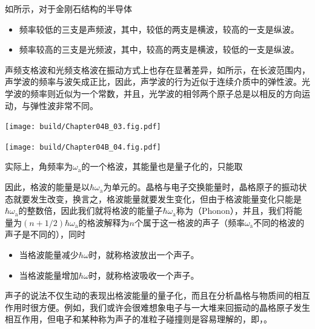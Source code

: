 如所示，对于金刚石结构的半导体
\begin{itemize}
    \item 频率较低的三支是声频波，其中，较低的两支是横波，较高的一支是纵波。
    \item 频率较高的三支是光频波，其中，较高的两支是横波，较低的一支是纵波。
\end{itemize}
声频支格波和光频支格波在振动方式上也存在显著差异，如所示，在长波范围内，声学波的频率与波矢成正比，因此，声学波的行为近似于连续介质中的弹性波。光学波的频率则近似为一个常数，并且，光学波的相邻两个原子总是以相反的方向运动，与弹性波非常不同。

\begin{Figure}[声频支和光频支的长波特性]
    \begin{FigureSub}[声频支的长波特性]
        \texttt{[image: build/Chapter04B\_03.fig.pdf]}
    \end{FigureSub}\vspace{0.75cm}
    \begin{FigureSub}[光频支的长波特性]
        \texttt{[image: build/Chapter04B\_04.fig.pdf]}
    \end{FigureSub}
\end{Figure}

实际上，角频率为$\omega_\text{a}$的一个格波，其能量也是量子化的，只能取
因此，格波的能量是以$\hbar\omega_\text{a}$为单元的。晶格与电子交换能量时，晶格原子的振动状态就要发生改变，换言之，格波能量就要发生变化，但由于格波能量变化只能是$\hbar\omega_\text{a}$的整数倍，因此我们就将格波的能量子$\hbar\omega_\text{a}$称为（Phonon），并且，我们将能量为$(n+1/2)\hbar\omega_\text{a}$的格波解释为$n$个属于这一格波的声子（频率$\omega_\text{a}$不同的格波的声子是不同的），同时
\begin{itemize}
    \item 当格波能量减少$\hbar\omega$时，就称格波放出一个声子。
    \item 当格波能量增加$\hbar\omega$时，就称格波吸收一个声子。
\end{itemize}
声子的说法不仅生动的表现出格波能量的量子化，而且在分析晶格与物质间的相互作用时很方便。例如，我们或许会很难想象电子与一大堆来回振动的晶格原子发生相互作用，但电子和某种称为声子的准粒子碰撞则是容易理解的，即，。

